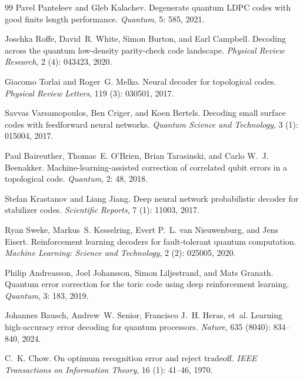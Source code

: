\documentclass[reprint,aps,prxquantum,amsmath,amssymb,floatfix,nofootinbib,longbibliography]{revtex4-2}
\theoremstyle{definition}
\theoremstyle{remark}
\theoremstyle{plain}
\begin{document}
\begin{thebibliography}{99}
Pavel Panteleev and Gleb Kalachev.
\newblock Degenerate quantum {LDPC} codes with good finite length performance.
\newblock \emph{Quantum}, 5: 585, 2021.

Joschka Roffe, David~R. White, Simon Burton, and Earl Campbell.
\newblock Decoding across the quantum low-density parity-check code landscape.
\newblock \emph{Physical Review Research}, 2 (4): 043423,
  2020.

Giacomo Torlai and Roger~G. Melko.
\newblock Neural decoder for topological codes.
\newblock \emph{Physical Review Letters}, 119 (3): 030501,
  2017.

Savvas Varsamopoulos, Ben Criger, and Koen Bertels.
\newblock Decoding small surface codes with feedforward neural networks.
\newblock \emph{Quantum Science and Technology}, 3 (1):
  015004, 2017.

Paul Baireuther, Thomas~E. O'Brien, Brian Tarasinski, and Carlo W.~J.
  Beenakker.
\newblock Machine-learning-assisted correction of correlated qubit errors in a
  topological code.
\newblock \emph{Quantum}, 2: 48, 2018.

Stefan Krastanov and Liang Jiang.
\newblock Deep neural network probabilistic decoder for stabilizer codes.
\newblock \emph{Scientific Reports}, 7 (1): 11003, 2017.

Ryan Sweke, Markus~S. Kesselring, Evert P.~L. van Nieuwenburg, and Jens Eisert.
\newblock Reinforcement learning decoders for fault-tolerant quantum
  computation.
\newblock \emph{Machine Learning: Science and Technology}, 2
  (2): 025005, 2020.

Philip Andreasson, Joel Johansson, Simon Liljestrand, and Mats Granath.
\newblock Quantum error correction for the toric code using deep reinforcement
  learning.
\newblock \emph{Quantum}, 3: 183, 2019.

Johannes Bausch, Andrew~W. Senior, Francisco J.~H. Heras, et~al.
\newblock Learning high-accuracy error decoding for quantum processors.
\newblock \emph{Nature}, 635 (8040): 834--840, 2024.

C.~K. Chow.
\newblock On optimum recognition error and reject tradeoff.
\newblock \emph{IEEE Transactions on Information Theory}, 16
  (1): 41--46, 1970.


\end{thebibliography}
\end{document}
